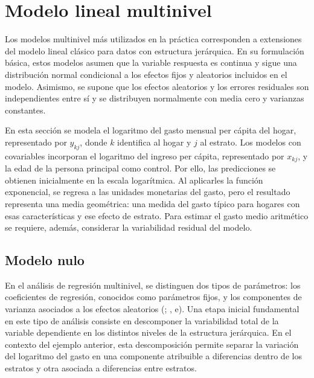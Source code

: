 \documentclass[
  spanish,
  11pt,
  letterpaper,
  oneside,
  open=any]{scrbook}
\begin{document}
\section{Modelo lineal multinivel}\label{modelo-lineal-multinivel}

Los modelos multinivel más utilizados en la práctica corresponden a
extensiones del modelo lineal clásico para datos con estructura
jerárquica. En su formulación básica, estos modelos asumen que la
variable respuesta es continua y sigue una distribución normal
condicional a los efectos fijos y aleatorios incluidos en el modelo.
Asimismo, se supone que los efectos aleatorios y los errores residuales
son independientes entre sí y se distribuyen normalmente con media cero
y varianzas constantes.

En esta sección se modela el logaritmo del gasto mensual per cápita del
hogar, representado por \(y_{kj}\), donde \(k\) identifica al hogar y
\(j\) al estrato. Los modelos con covariables incorporan el logaritmo
del ingreso per cápita, representado por \(x_{kj}\), y la edad de la
persona principal como control. Por ello, las predicciones se obtienen
inicialmente en la escala logarítmica. Al aplicarles la función
exponencial, se regresa a las unidades monetarias del gasto, pero el
resultado representa una media geométrica: una medida del gasto típico
para hogares con esas características y ese efecto de estrato. Para
estimar el gasto medio aritmético se requiere, además, considerar la
variabilidad residual del modelo.

\subsection{Modelo nulo}\label{sec-multinivel-muestras-complejas}

En el análisis de regresión multinivel, se distinguen dos tipos de
parámetros: los coeficientes de regresión, conocidos como parámetros
fijos, y los componentes de varianza asociados a los efectos aleatorios
(;
,
e). Una etapa inicial fundamental en este tipo de análisis consiste en
descomponer la variabilidad total de la variable dependiente en los
distintos niveles de la estructura jerárquica. En el contexto del
ejemplo anterior, esta descomposición permite separar la variación del
logaritmo del gasto en una componente atribuible a diferencias dentro de
los estratos y otra asociada a diferencias entre estratos.
\end{document}
